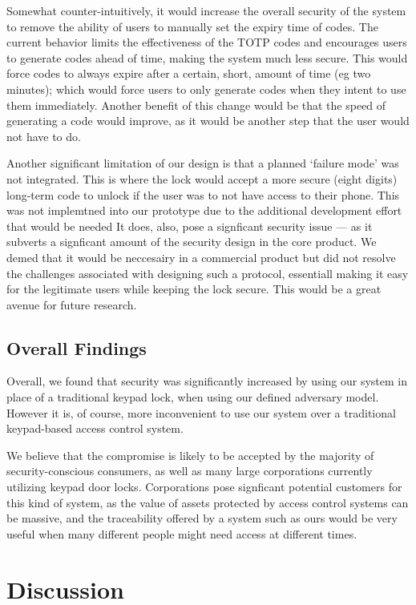\documentclass[conference]{IEEEtran}
\begin{document}
Somewhat counter-intuitively, it would increase the overall security of the system to remove the ability of users to manually set the expiry time of codes.
The current behavior limits the effectiveness of the TOTP codes and encourages users to generate codes ahead of time, making the system much less secure.
This would force codes to always expire after a certain, short, amount of time (eg two minutes); which would force users to only generate codes when they intent to use them immediately.
Another benefit of this change would be that the speed of generating a code would improve, as it would be another step that the user would not have to do.

Another significant limitation of our design is that a planned `failure mode' was not integrated. This is where the lock would accept a more secure (eight digits) long-term code to unlock if the user was to not have access to their phone.
This was not implemtned into our prototype due to the additional development effort that would be needed
It does, also, pose a signficant security issue --- as it subverts a signficant amount of the security design in the core product.
We demed that it would be neccesairy in a commercial product but did not resolve the challenges associated with designing such a protocol, essentiall making it easy for the legitimate users while keeping the lock secure.
This would be a great avenue for future research.

\subsection{Overall Findings}
Overall, we found that security was significantly increased by using our system in place of a traditional keypad lock, when using our defined adversary model.
However it is, of course, more inconvenient to use our system over a traditional keypad-based access control system. 

We believe that the compromise is likely to be accepted by the majority of security-conscious consumers, as well as many large corporations currently utilizing keypad door locks.
Corporations pose signficant potential customers for this kind of system, as the value of assets protected by access control systems can be massive, and the traceability offered by a system such as ours would be very useful when many different people might need access at different times.



\section{Discussion}
\end{document}
